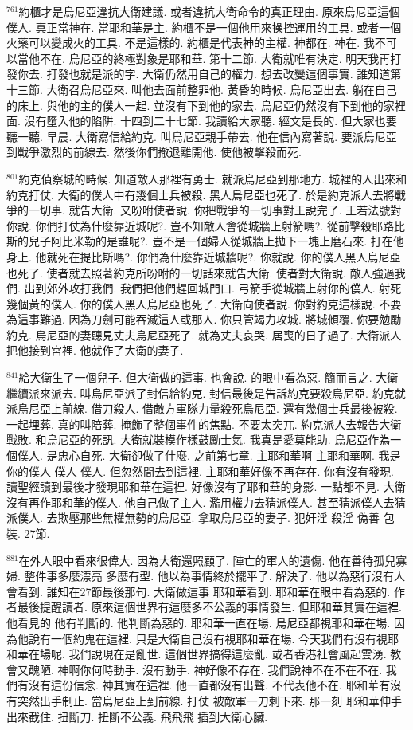 \documentclass{book}
\begin{document}
$^{761}$約櫃才是烏尼亞違抗大衛建議.
或者違抗大衛命令的真正理由.
原來烏尼亞這個僕人.
真正當神在.
當耶和華是主.
約櫃不是一個他用來操控運用的工具.
或者一個火藥可以變成火的工具.
不是這樣的.
約櫃是代表神的主權.
神都在.
神在.
我不可以當他不在.
烏尼亞的終極對象是耶和華.
第十二節.
大衛就唯有決定.
明天我再打發你去.
打發也就是派的字.
大衛仍然用自己的權力.
想去改變這個事實.
誰知道第十三節.
大衛召烏尼亞來.
叫他去面前整罪他.
黃昏的時候.
烏尼亞出去.
躺在自己的床上.
與他的主的僕人一起.
並沒有下到他的家去.
烏尼亞仍然沒有下到他的家裡面.
沒有墮入他的陷阱.
十四到二十七節.
我讀給大家聽.
經文是長的.
但大家也要聽一聽.
早晨.
大衛寫信給約克.
叫烏尼亞親手帶去.
他在信內寫著說.
要派烏尼亞到戰爭激烈的前線去.
然後你們撤退離開他.
使他被擊殺而死.

$^{801}$約克偵察城的時候.
知道敵人那裡有勇士.
就派烏尼亞到那地方.
城裡的人出來和約克打仗.
大衛的僕人中有幾個士兵被殺.
黑人烏尼亞也死了.
於是約克派人去將戰爭的一切事.
就告大衛.
又吩咐使者說.
你把戰爭的一切事對王說完了.
王若法號對你說.
你們打仗為什麼靠近城呢?.
豈不知敵人會從城牆上射箭嗎?.
從前擊殺耶路比斯的兒子阿比米勒的是誰呢?.
豈不是一個婦人從城牆上拋下一塊上磨石來.
打在他身上.
他就死在提比斯嗎?.
你們為什麼靠近城牆呢?.
你就說.
你的僕人黑人烏尼亞也死了.
使者就去照著約克所吩咐的一切話來就告大衛.
使者對大衛說.
敵人強過我們.
出到郊外攻打我們.
我們把他們趕回城門口.
弓箭手從城牆上射你的僕人.
射死幾個黃的僕人.
你的僕人黑人烏尼亞也死了.
大衛向使者說.
你對約克這樣說.
不要為這事難過.
因為刀劍可能吞滅這人或那人.
你只管竭力攻城.
將城傾覆.
你要勉勵約克.
烏尼亞的妻聽見丈夫烏尼亞死了.
就為丈夫哀哭.
居喪的日子過了.
大衛派人把他接到宮裡.
他就作了大衛的妻子.

$^{841}$給大衛生了一個兒子.
但大衛做的這事.
也會說.
的眼中看為惡.
簡而言之.
大衛繼續派來派去.
叫烏尼亞派了封信給約克.
封信最後是告訴約克要殺烏尼亞.
約克就派烏尼亞上前線.
借刀殺人.
借敵方軍隊力量殺死烏尼亞.
還有幾個士兵最後被殺.
一起埋葬.
真的叫陪葬.
掩飾了整個事件的焦點.
不要太突兀.
約克派人去報告大衛戰敗.
和烏尼亞的死訊.
大衛就裝模作樣鼓勵士氣.
我真是愛莫能助.
烏尼亞作為一個僕人.
是忠心自死.
大衛卻做了什麼.
之前第七章.
主耶和華啊 主耶和華啊.
我是你的僕人 僕人 僕人.
但忽然間去到這裡.
主耶和華好像不再存在.
你有沒有發現.
讀聖經讀到最後才發現耶和華在這裡.
好像沒有了耶和華的身影.
一點都不見.
大衛沒有再作耶和華的僕人.
他自己做了主人.
濫用權力去猜派僕人.
甚至猜派僕人去猜派僕人.
去欺壓那些無權無勢的烏尼亞.
拿取烏尼亞的妻子.
犯奸淫 殺淫 偽善 包裝.
27節.

$^{881}$在外人眼中看來很偉大.
因為大衛還照顧了.
陣亡的軍人的遺傷.
他在善待孤兒寡婦.
整件事多麼漂亮 多麼有型.
他以為事情終於擺平了.
解決了.
他以為惡行沒有人會看到.
誰知在27節最後那句.
大衛做這事 耶和華看到.
耶和華在眼中看為惡的.
作者最後提醒讀者.
原來這個世界有這麼多不公義的事情發生.
但耶和華其實在這裡.
他看見的 他有判斷的.
他判斷為惡的.
耶和華一直在場.
烏尼亞都視耶和華在場.
因為他說有一個約鬼在這裡.
只是大衛自己沒有視耶和華在場.
今天我們有沒有視耶和華在場呢.
我們說現在是亂世.
這個世界搞得這麼亂.
或者香港社會風起雲湧.
教會又醜陋.
神啊你何時動手.
沒有動手.
神好像不存在.
我們說神不在不在不在.
我們有沒有這份信念.
神其實在這裡.
他一直都沒有出聲.
不代表他不在.
耶和華有沒有突然出手制止.
當烏尼亞上到前線.
打仗 被敵軍一刀刺下來.
那一刻 耶和華伸手出來截住.
扭斷刀.
扭斷不公義.
飛飛飛 插到大衛心臟.
\end{document}
